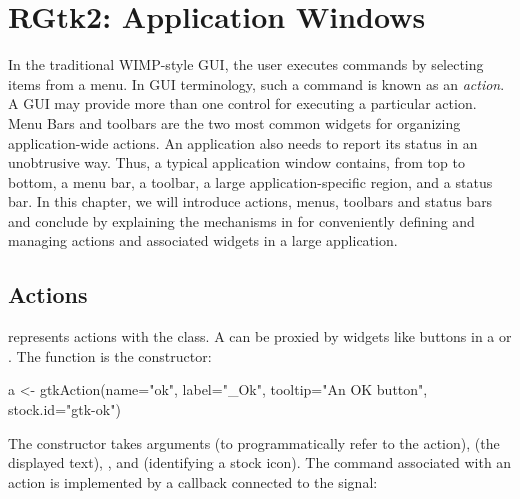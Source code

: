 




\chapter{RGtk2: Application Windows}
\label{sec:RGtk2-menus}


In the traditional WIMP-style GUI, the user executes commands by
selecting items from a menu. In GUI terminology, such a command is
known as an \textit{action}. A GUI may provide more than one control
for executing a particular action. Menu Bars and toolbars are the two
most common widgets for organizing application-wide actions. An
application also needs to report its status in an unobtrusive
way. Thus, a typical application window contains, from top to bottom, 
a menu bar, a toolbar, a large application-specific region, and a
status bar.  In this chapter, we will introduce actions, menus,
toolbars and status bars and conclude by explaining the mechanisms in
\GTK\/ for conveniently defining and managing actions and associated
widgets in a large application.

\section{Actions}
\label{sec:RGtk2:actions}


\GTK\/ represents actions with the  class. A
 can be proxied by widgets like buttons in a
 or .  The 
function is the constructor:
\begin{Schunk}
\begin{Sinput}
 a <- gtkAction(name="ok", label="_Ok", 
                tooltip="An OK button", stock.id="gtk-ok")
\end{Sinput}
\end{Schunk}
%
The constructor takes arguments  (to
programmatically refer to the action), 
(the displayed text), , and
 (identifying a stock icon).  The
command associated with an action is implemented by a callback
connected to the  signal:
\begin{Schunk}
\end{Schunk}

